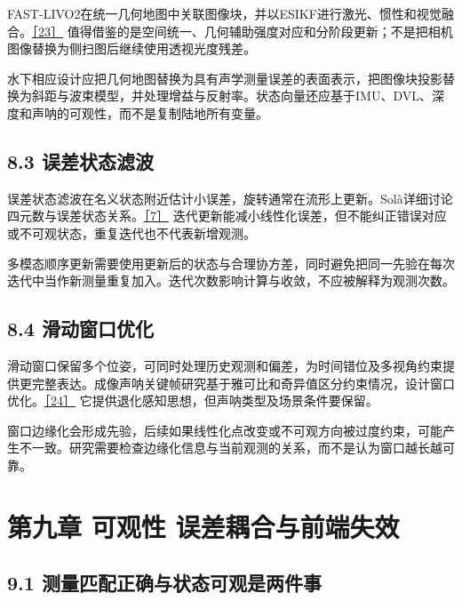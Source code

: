 FAST-LIVO2在统一几何地图中关联图像块，并以ESIKF进行激光、惯性和视觉融合。\href{https://arxiv.org/abs/2408.14035}{［23］} 值得借鉴的是空间统一、几何辅助强度对应和分阶段更新；不是把相机图像替换为侧扫图后继续使用透视光度残差。

水下相应设计应把几何地图替换为具有声学测量误差的表面表示，把图像块投影替换为斜距与波束模型，并处理增益与反射率。状态向量还应基于IMU、DVL、深度和声呐的可观性，而不是复制陆地所有变量。

\hypertarget{ux8befux5deeux72b6ux6001ux6ee4ux6ce2}{%
\subsection{8.3 误差状态滤波}\label{ux8befux5deeux72b6ux6001ux6ee4ux6ce2}}

误差状态滤波在名义状态附近估计小误差，旋转通常在流形上更新。Solà详细讨论四元数与误差状态关系。\href{https://arxiv.org/abs/1711.02508}{［7］} 迭代更新能减小线性化误差，但不能纠正错误对应或不可观状态，重复迭代也不代表新增观测。

多模态顺序更新需要使用更新后的状态与合理协方差，同时避免把同一先验在每次迭代中当作新测量重复加入。迭代次数影响计算与收敛，不应被解释为观测次数。

\hypertarget{ux6ed1ux52a8ux7a97ux53e3ux4f18ux5316}{%
\subsection{8.4 滑动窗口优化}\label{ux6ed1ux52a8ux7a97ux53e3ux4f18ux5316}}

滑动窗口保留多个位姿，可同时处理历史观测和偏差，为时间错位及多视角约束提供更完整表达。成像声呐关键帧研究基于雅可比和奇异值区分约束情况，设计窗口优化。\href{https://arxiv.org/abs/2106.16032}{［24］} 它提供退化感知思想，但声呐类型及场景条件要保留。

窗口边缘化会形成先验，后续如果线性化点改变或不可观方向被过度约束，可能产生不一致。研究需要检查边缘化信息与当前观测的关系，而不是认为窗口越长越可靠。

\hypertarget{ux7b2cux4e5dux7ae0-ux53efux89c2ux6027-ux8befux5deeux8026ux5408ux4e0eux524dux7aefux5931ux6548}{%
\section{第九章 可观性 误差耦合与前端失效}\label{ux7b2cux4e5dux7ae0-ux53efux89c2ux6027-ux8befux5deeux8026ux5408ux4e0eux524dux7aefux5931ux6548}}

\hypertarget{ux6d4bux91cfux5339ux914dux6b63ux786eux4e0eux72b6ux6001ux53efux89c2ux662fux4e24ux4ef6ux4e8b}{%
\subsection{9.1 测量匹配正确与状态可观是两件事}\label{ux6d4bux91cfux5339ux914dux6b63ux786eux4e0eux72b6ux6001ux53efux89c2ux662fux4e24ux4ef6ux4e8b}}

